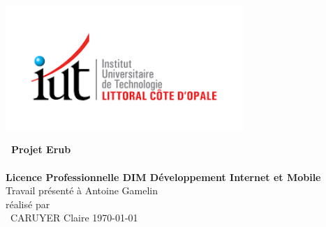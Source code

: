 \thispagestyle{empty}	%
\includegraphics[width=9cm]{img/calais.png}	%
\vspace{2cm}	%
\begin{center}	%
{\huge \bf\ Projet Erub}  \\
{\Large \bf\ \\Licence Professionnelle DIM Développement Internet et Mobile}  \\%
\vspace{3cm}
\large Travail présenté à Antoine Gamelin \\
\vspace{3cm}
réalisé par \\ \ CARUYER Claire 
\vfill	%
\today
\pagebreak
\end{center}